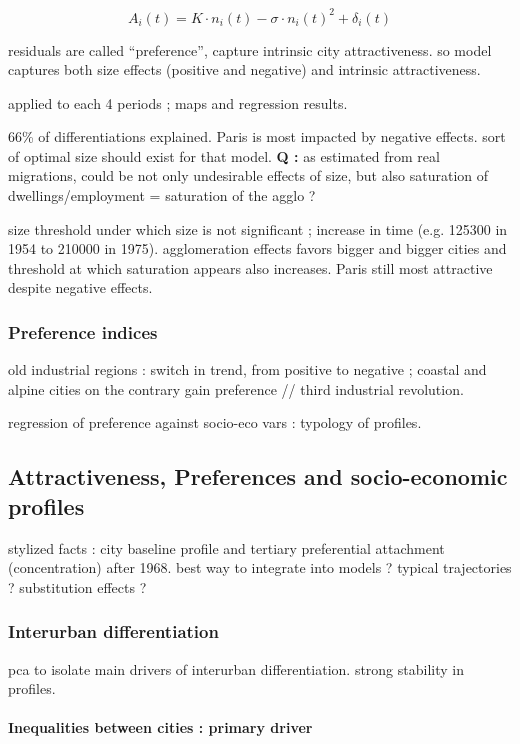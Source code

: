 \[
A_i(t) = K\cdot n_i(t) - \sigma\cdot n_i(t)^2 + \delta_i(t)
\]

residuals are called ``preference'', capture intrinsic city attractiveness. so model captures both size effects (positive and negative) and intrinsic attractiveness.

applied to each 4 periods ; maps and regression results.

66\% of differentiations explained. Paris is most impacted by negative effects. sort of optimal size should exist for that model. \textbf{Q : } as estimated from real migrations, could be not only undesirable effects of size, but also saturation of dwellings/employment = saturation of the agglo ?

size threshold under which size is not significant ; increase in time (e.g. 125300 in 1954 to 210000 in 1975). agglomeration effects favors bigger and bigger cities and threshold at which saturation appears also increases. Paris still most attractive despite negative effects.


\subsubsection{Preference indices}

old industrial regions : switch in trend, from positive to negative ; coastal and alpine cities on the contrary gain preference // third industrial revolution.

regression of preference against socio-eco vars : typology of profiles.


\subsection{Attractiveness, Preferences and socio-economic profiles}

stylized facts : city baseline profile and tertiary preferential attachment (concentration) after 1968. best way to integrate into models ? typical trajectories ? substitution effects ?

\subsubsection{Interurban differentiation}

pca to isolate main drivers of interurban differentiation. strong stability in profiles.

\paragraph{Inequalities between cities : primary driver}

